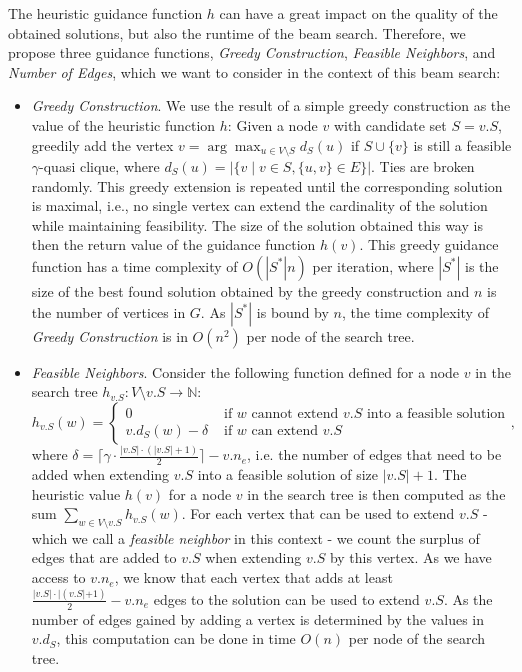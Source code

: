 \documentclass[draft,final]{vutinfth} %
\begin{document}
The heuristic guidance function $h$ can have a great impact on the quality of the obtained solutions, but also the runtime of the beam search. Therefore, we propose three guidance functions, \emph{Greedy Construction}, \emph{Feasible Neighbors}, and \emph{Number of Edges}, which we want to consider in the context of this beam search: 
\begin{itemize}
    \item \emph{Greedy Construction}. We use the result of a simple greedy construction as the value of the heuristic function $h$: Given a node $v$ with candidate set $S = v.S$, greedily add the vertex $v = \arg \max_{u \in V \setminus S} d_S(u)$ if $S \cup \{v\}$ is still a feasible $\gamma$-quasi clique, where $d_S(u) = |\{v \mid v \in S, \{u,v\} \in E \}|$. 
    Ties are broken randomly. This greedy extension is repeated until the corresponding solution is maximal, i.e., no single vertex can extend the cardinality of the solution while maintaining feasibility. 
    The size of the solution obtained this way is then the return value of the guidance function $h(v)$. This greedy guidance function has a time complexity of $O(|S^*|n)$ per iteration, where $|S^*|$ is the size of the best found solution obtained by the greedy construction and $n$ is the number of vertices in $G$. As $|S^*|$ is bound by $n$, the time complexity of \emph{Greedy Construction} is in $O(n^2)$ per node of the search tree. 
    \item \emph{Feasible Neighbors}. Consider the following function defined for a node $v$ in the search tree $h_{v.S} \colon V \setminus v.S \rightarrow \mathbb{N}$: 
    \[
        h_{v.S}(w) = 
        \begin{cases}
            0 & \text{ if $w$ cannot extend $v.S$ into a feasible solution}\\
            \mathit{v.d_S}(w) - \delta & \text{ if $w$ can extend $v.S$ }
        \end{cases},
    \]
    where $\delta = \lceil \gamma \cdot \frac{|v.S|\cdot (|v.S|+1)}{2} \rceil - v.n_e$, i.e. the number of edges that need to be added when extending $v.S$ into a feasible solution of size $|v.S|+1$. 
    The heuristic value $h(v)$ for a node $v$ in the search tree is then computed as the sum $\sum_{w \in V \setminus v.S} h_{v.S}(w)$. 
    For each vertex that can be used to extend $v.S$ - which we call a \emph{feasible neighbor} in this context - we count the surplus of edges that are added to $v.S$ when extending $v.S$ by this vertex. As we have access to $v.n_e$, we know that each vertex that adds at least $\frac{|v.S|\cdot|(v.S|+1)}{2} - v.n_e$ edges to the solution can be used to extend $v.S$. As the number of edges gained by adding a vertex is determined by the values in $v.d_S$, this computation can be done in time $O(n)$ per node of the search tree. 

\end{itemize}
\end{document}
